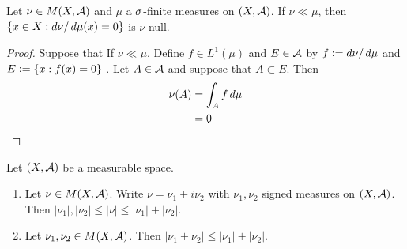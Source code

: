\documentclass{book}
\begin{document}
	\begin{ex}  
		Let $\nu \in M(X, \mathcal{A})$ and $\mu$ a $\sigma$-finite measures on $(X,\mathcal{A})$. If $\nu \ll \mu$, then $\{x \in X: d\nu / \, d \mu(x) = 0 \}$ is $\nu$-null.
	\end{ex}
	
	\begin{proof}
		Suppose that If $\nu \ll \mu$. Define $f \in L^1(\mu)$ and $E \in \mathcal{A}$ by $f \vcentcolon= d\nu / \, d \mu$ and $E \vcentcolon= \{x: f(x) = 0\}$ . Let $A \in \mathcal{A}$ and suppose that $A \subset E$. Then 
		\begin{align*}
			\nu(A) 
			&= \int_A f \, d \mu\\
			&= 0
		\end{align*} 
	\end{proof}
	
	\begin{ex}  
		Let $(X, \mathcal{A})$ be a measurable space. 
		\begin{enumerate}
			\item Let $\nu \in M(X, \mathcal{A})$. Write $\nu = \nu_1 + i\nu_2$ with $\nu_1, \nu_2$ signed measures on $(X, \mathcal{A})$. Then $|\nu_1|, |\nu_2| \leq |\nu| \leq |\nu_1| + |\nu_2|$.
			\item Let $\nu_1, \nu_2 \in M(X, \mathcal{A})$. Then $|\nu_1 + \nu_2| \leq |\nu_1| + |\nu_2|$.
		\end{enumerate}
	\end{ex}
	
\end{document}
